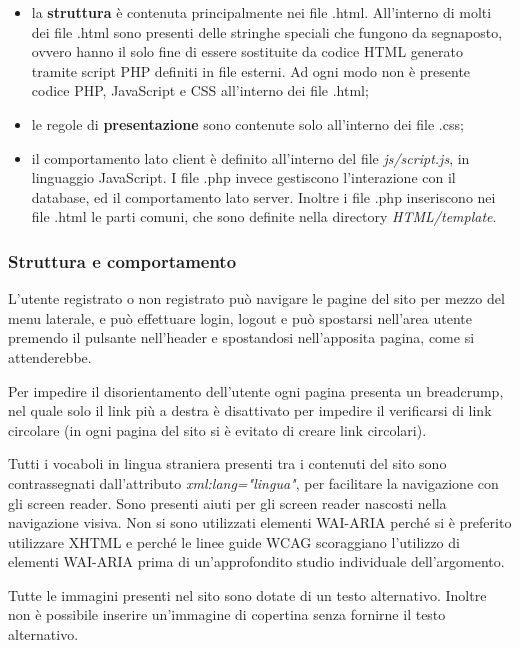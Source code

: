 \documentclass[12pt,a4paper,headings=optiontohead]{article}
\begin{document}
\begin{itemize}
	\item la \textbf{struttura} è contenuta principalmente nei file .html. All'interno di molti dei file .html sono presenti delle stringhe speciali che fungono da segnaposto, ovvero hanno il solo fine di essere sostituite da codice HTML generato tramite script PHP definiti in file esterni. Ad ogni modo non è presente codice PHP, JavaScript e CSS all'interno dei file .html;
	\item le regole di \textbf{presentazione} sono contenute solo all'interno dei file .css;
	\item il comportamento lato client è definito all'interno del file \textit{js/script.js}, in linguaggio JavaScript. I file .php invece gestiscono l'interazione con il database, ed il comportamento lato server. Inoltre i file .php inseriscono nei file .html le parti comuni, che sono definite nella directory \textit{HTML/template}.
\end{itemize}

\subsubsection{Struttura e comportamento}
L'utente registrato o non registrato può navigare le pagine del sito per mezzo del menu laterale, e può effettuare login, logout e può spostarsi nell'area utente premendo il pulsante nell'header e spostandosi nell'apposita pagina, come si attenderebbe.

Per impedire il disorientamento dell'utente ogni pagina presenta un breadcrump, nel quale solo il link più a destra è disattivato per impedire il verificarsi di link circolare (in ogni pagina del sito si è evitato di creare link circolari).

Tutti i vocaboli in lingua straniera presenti tra i contenuti del sito sono contrassegnati dall'attributo \textit{xml:lang="lingua"}, per facilitare la navigazione con gli screen reader. Sono presenti aiuti per gli screen reader nascosti nella navigazione visiva. Non si sono utilizzati elementi WAI-ARIA perché si è preferito utilizzare XHTML e perché le linee guide WCAG scoraggiano l'utilizzo di elementi WAI-ARIA prima di un'approfondito studio individuale dell'argomento.

Tutte le immagini presenti nel sito sono dotate di un testo alternativo. Inoltre non è possibile inserire un'immagine di copertina senza fornirne il testo alternativo.
\end{document}
